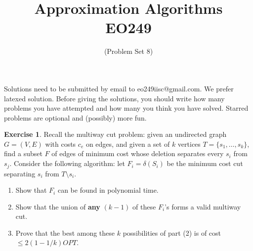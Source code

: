 \documentclass[11pt]{article}
\theoremstyle{definition}
\newtheorem{exercise}{Exercise}
\begin{document}
\title{{\bf Approximation Algorithms} \\ 
{\normalsize EO249}}
\date{(Problem Set 8)}
\maketitle
{\small 
Solutions need to be submitted by email to eo249iisc@gmail.com. We prefer latexed solution. 
Before giving the solutions, you should write how many problems you have attempted and how many you think you have solved.
Starred problems are optional and (possibly) more fun.
}
\vspace{1ex}
\def\poly{\mathrm{poly}}
\def\Exp{\mathbf{Exp}}
\def\Pr{\mathbf{Pr}}

\begin{exercise}
Recall the multiway cut problem: given an undirected graph $G=(V,E)$ with costs $c_e$ on edges, and given a set of $k$ vertices $T = \{s_1,\ldots,s_k\}$, find a subset $F$ of edges of minimum cost whose deletion separates every $s_i$ from $s_j$. Consider the following algorithm: let $F_i = \delta(S_i)$ be the minimum cost cut separating $s_i$ from 
$T\setminus s_i$.
\begin{enumerate}
\item Show that $F_i$ can be found in polynomial time.
\item Show that the union of {\bf any} $(k-1)$ of these $F_i$'s forms a valid multiway cut.
\item Prove that the best among these $k$ possibilities of part (2) is of cost $\leq 2(1-1/k) OPT$.
\end{enumerate}
\end{exercise}
\vspace{1ex}
\end{document}

